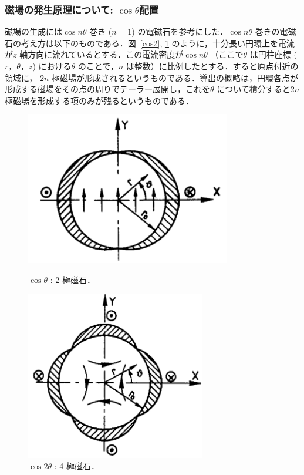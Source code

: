 \subsubsection{磁場の発生原理について: $\cos \theta$配置}
磁場の生成には$\cos n \theta$ 巻き ($n=1$) の電磁石を参考にした．$\cos n \theta$ 巻きの電磁石の考え方は以下のものである．図~\ref{cos2}, \ref{cos4} のように，十分長い円環上を電流が$z$ 軸方向に流れているとする．この電流密度が$\cos n\theta$ （ここで$\theta$ は円柱座標 ($r，\theta，z$) における$\theta$ のことで，$n$ は整数）に比例したとする．すると原点付近の領域に， $2n$ 極磁場が形成されるというものである．導出の概略は，円環各点が形成する磁場をその点の周りでテーラー展開し，これを$\theta$ について積分すると$2n$ 極磁場を形成する項のみが残るというものである\cite{magnet}．
\begin{figure}[H]
\begin{minipage}{0.45\hsize}
\centering
\includegraphics[width=0.8\textwidth]{figure/tajima/cos.png}
\caption{$\cos\theta$ : 2 極磁石\cite{magnet}．}
\label{cos2}
\end{minipage}
\hfill
\begin{minipage}{0.45\hsize}
\centering
\includegraphics[width=0.7\textwidth]{figure/tajima/cos2.png}
\caption{$\cos 2 \theta$ : 4 極磁石\cite{magnet}．}
\label{cos4}
\end{minipage}
\end{figure}


